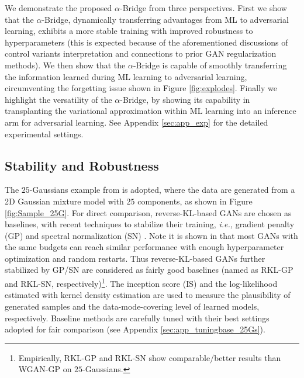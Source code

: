 \documentclass[letterpaper]{article} %
\newcommand{\ie}[0]{\emph{i.e., }}
\begin{document}
We demonstrate the proposed $\alpha$-Bridge from three perspectives.
First we show that the $\alpha$-Bridge, dynamically transferring advantages from ML to adversarial learning, exhibits a more stable training with improved robustness to hyperparameters (this is expected because of the aforementioned discussions of control variants interpretation and connections to prior GAN regularization methods).
We then show that the $\alpha$-Bridge is capable of smoothly transferring the information learned during ML learning to adversarial learning, circumventing the forgetting issue shown in Figure \ref{fig:explodes}.
Finally we highlight the versatility of the $\alpha$-Bridge, by showing its capability in transplanting the variational approximation within ML learning into an inference arm for adversarial learning. See
Appendix \ref{sec:app_exp}
for the detailed experimental settings.


\subsection{Stability and Robustness}
\label{sec:exp_25Gaussian}


The $25$-Gaussians example from \cite{tao2018chi} is adopted, where the data are generated from a 2D Gaussian mixture model with $25$ components, as shown in Figure \ref{fig:Sample_25G}. For direct comparison, reverse-KL-based GANs are chosen as baselines, with recent techniques to stabilize their training, \ie gradient penalty (GP) \cite{mescheder2018training} and spectral normalization (SN) \cite{miyato2018spectral}. Note it is shown in \cite{GoogleCompareGAN} that most GANs with the same budgets can reach similar performance with enough hyperparameter optimization and random restarts. Thus reverse-KL-based GANs further stabilized by GP/SN are considered as fairly good baselines (named as RKL-GP and RKL-SN, respectively)\footnote{Empirically, RKL-GP and RKL-SN show comparable/better results than WGAN-GP \cite{gulrajani2017improved} on $25$-Gaussians.}.
The inception score (IS) \cite{salimans2016improved} and the log-likelihood estimated with kernel density estimation \cite{parzen1962estimation} are used to measure the plausibility of generated samples and the data-mode-covering level of learned models, respectively.
Baseline methods are carefully tuned with their best settings adopted for fair comparison (see
Appendix \ref{sec:app_tuningbase_25Gs}).
\end{document}
